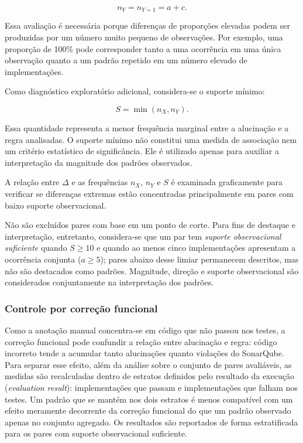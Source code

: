 \[
n_Y=n_{Y=1}=a+c.
\]

Essa avaliação é necessária porque diferenças de proporções elevadas podem ser produzidas por um número muito pequeno de observações. Por exemplo, uma proporção de 100\% pode corresponder tanto a uma ocorrência em uma única observação quanto a um padrão repetido em um número elevado de implementações.

Como diagnóstico exploratório adicional, considera-se o suporte mínimo:

\[
S=\min(n_X,n_Y).
\]

Essa quantidade representa a menor frequência marginal entre a alucinação e a regra analisadas. O suporte mínimo não constitui uma medida de associação nem um critério estatístico de significância. Ele é utilizado apenas para auxiliar a interpretação da magnitude dos padrões observados.

A relação entre $\Delta$ e as frequências $n_X$, $n_Y$ e $S$ é examinada graficamente para verificar se diferenças extremas estão concentradas principalmente em pares com baixo suporte observacional.

Não são excluídos pares com base em um ponto de corte. Para fins de destaque e interpretação, entretanto, considera-se que um par tem \textit{suporte observacional suficiente} quando $S \ge 10$ e quando ao menos cinco implementações apresentam a ocorrência conjunta ($a \ge 5$); pares abaixo desse limiar permanecem descritos, mas não são destacados como padrões. Magnitude, direção e suporte observacional são considerados conjuntamente na interpretação dos padrões.

\subsubsection{Controle por correção funcional}

Como a anotação manual concentra-se em código que não passou nos testes, a correção funcional pode confundir a relação entre alucinação e regra: código incorreto tende a acumular tanto alucinações quanto violações do SonarQube. Para separar esse efeito, além da análise sobre o conjunto de pares avaliáveis, as medidas são recalculadas dentro de estratos definidos pelo resultado da execução (\textit{evaluation result}): implementações que passam e implementações que falham nos testes. Um padrão que se mantém nos dois estratos é menos compatível com um efeito meramente decorrente da correção funcional do que um padrão observado apenas no conjunto agregado. Os resultados são reportados de forma estratificada para os pares com suporte observacional suficiente.


